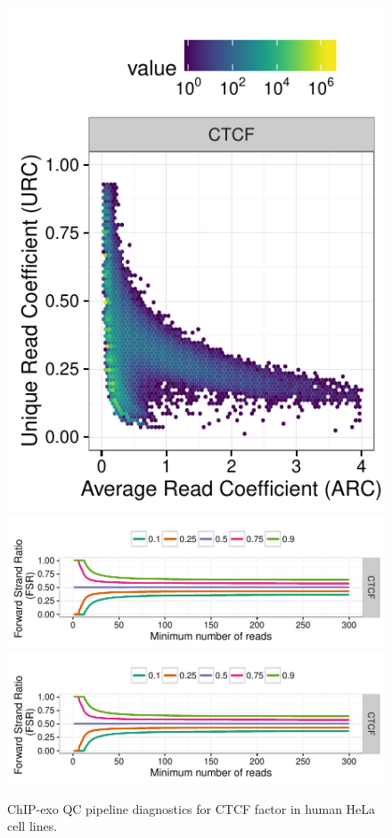 \documentclass{article}
\begin{document}
\begin{figure}[H]
  \centering
  \includegraphics[width = .35\textwidth,page =
1]{figures/supplement/QC/Pugh_CTCF_hela_enrichment.pdf}\\
\includegraphics[width = .65\textwidth,page =
1]{figures/supplement/QC/Pugh_CTCF_hela_strand_imbalance.pdf}
\includegraphics[width = .65\textwidth,page =
3]{figures/supplement/QC/Pugh_CTCF_hela_strand_imbalance.pdf}
\caption{ChIP-exo QC pipeline diagnostics for CTCF factor in human
  HeLa cell lines.}
  \label{sfig:qc3}
\end{figure}
\end{document}
